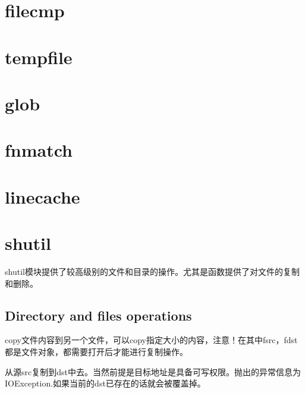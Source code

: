 \section{filecmp}





\section{tempfile}





\section{glob}





\section{fnmatch}





\section{linecache}





\section{shutil}
shutil模块提供了较高级别的文件和目录的操作。尤其是函数提供了对文件的复制和删除。
\subsection{Directory and files operations}
\noindent{\color{red}{shutil.copyfileobj(fsrc, fdst[, length]):}}
\par{copy文件内容到另一个文件，可以copy指定大小的内容，注意！在其中fsrc，fdst都是文件对象，都需要打开后才能进行复制操作。}\\

\noindent{\color{red}{shutil.copyfile(src, dst, *, follow\_sysmlinks=True):}}
\par{从源src复制到dst中去。当然前提是目标地址是具备可写权限。抛出的异常信息为IOException.如果当前的dst已存在的话就会被覆盖掉。}\\

